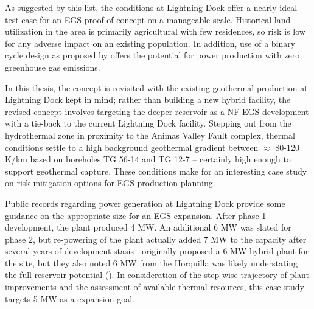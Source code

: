 As suggested by this list, the conditions at Lightning Dock offer a nearly ideal test case for an EGS proof of concept on a manageable scale. Historical land utilization in the area is primarily agricultural with few residences, so risk is low for any adverse impact on an existing population. In addition, use of a binary cycle design as proposed by \citet{schochet_development_2001} offers the potential for power production with zero greenhouse gas emissions.  

In this thesis, the \citeauthor{schochet_development_2001} concept is revisited with the existing geothermal production at Lightning Dock kept in mind; rather than building a new hybrid facility, the revised concept involves targeting the deeper reservoir as a NF-EGS development with a tie-back to the current Lightning Dock facility. Stepping out from the hydrothermal zone in proximity to the Animas Valley Fault complex, thermal conditions settle to a high background geothermal gradient between $\approx$ 80-120 K/km based on boreholes TG 56-14 and TG 12-7 \citep{cunniff_final_2003} -- certainly high enough to support geothermal capture. These conditions make for an interesting case study on risk mitigation options for EGS production planning.

Public records regarding power generation at Lightning Dock provide some guidance on the appropriate size for an EGS expansion. After phase 1 development, the plant produced 4 MW. An additional 6 MW was slated for phase 2, but re-powering of the plant actually added 7 MW to the capacity after several years of development stasis \citep{think_geoenergy_turboden_2020}. \citeauthor{schochet_development_2001} originally proposed a 6 MW hybrid plant for the site, but they also noted 6 MW from the Horquilla was likely understating the full reservoir potential (\citeyear{schochet_development_2001}). In consideration of the step-wise trajectory of plant improvements and the assessment of available thermal resources, this case study targets 5 MW as a expansion goal. 

